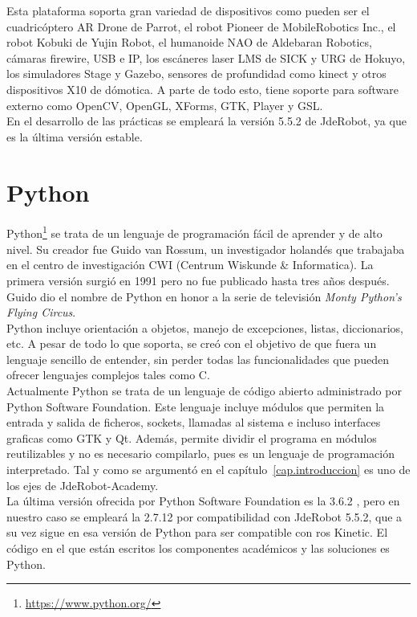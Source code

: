 Esta plataforma soporta gran variedad de dispositivos como pueden ser el cuadricóptero AR Drone de Parrot, el robot Pioneer de MobileRobotics Inc., el robot Kobuki de Yujin Robot, el humanoide NAO de Aldebaran Robotics, cámaras firewire, USB e IP, los escáneres laser LMS de SICK y URG de Hokuyo, los simuladores Stage y Gazebo, sensores de profundidad como kinect y otros dispositivos X10 de dómotica. A parte de todo esto, tiene soporte para software externo como OpenCV, OpenGL, XForms, GTK, Player y GSL.   \\

En el desarrollo de las prácticas se empleará la versión 5.5.2 de JdeRobot, ya que es la última versión estable.


\section{Python}
Python\footnote{\url{https://www.python.org/}} se trata de un lenguaje de programación fácil de aprender y de alto nivel. Su creador fue Guido van Rossum, un investigador holandés que trabajaba en el centro de investigación CWI (Centrum Wiskunde \& Informatica). La primera versión surgió en 1991 pero no fue publicado hasta tres años después. Guido dio el nombre de Python en honor a la serie de televisión  \textit{Monty Python’s Flying Circus}.\\


Python incluye orientación a objetos, manejo de excepciones, listas, diccionarios, etc. A pesar de todo lo que soporta, se creó con el objetivo de que fuera un lenguaje sencillo de entender, sin perder todas las funcionalidades que pueden ofrecer lenguajes complejos tales como C.\\

Actualmente Python se trata de un lenguaje de código abierto administrado por Python Software Foundation. Este lenguaje incluye módulos que permiten la entrada y salida de ficheros, sockets, llamadas al sistema e incluso interfaces graficas como GTK y Qt. Además, permite dividir el programa en módulos reutilizables y no es necesario compilarlo, pues es un lenguaje de programación interpretado. Tal y como se argumentó en el capítulo~\ref{cap.introduccion} es uno de los ejes de JdeRobot-Academy.\\

La última versión ofrecida por Python Software Foundation es la 3.6.2 , pero en nuestro caso se empleará la 2.7.12 por compatibilidad con JdeRobot 5.5.2, que a su vez sigue en esa versión de Python para ser compatible con \acrshort{ros} Kinetic. El código en el que están escritos los componentes académicos y las soluciones es Python.

